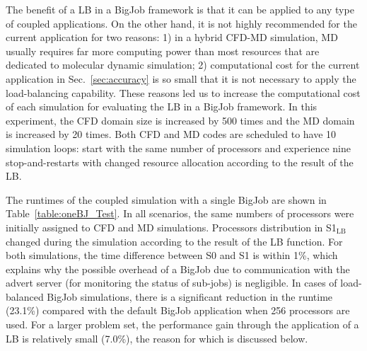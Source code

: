\documentclass[preprint,12pt]{elsarticle}
\newcommand{\subscript}[1]{\ensuremath{_{\textrm{#1}}}}
\newcommand{\lb}[0]{\subscript{LB} }
\begin{document}
The benefit of a LB in a BigJob framework is that it can be applied to any type of coupled applications. On the other hand, it is not highly recommended for the current application for two reasons: 1) in a hybrid CFD-MD simulation, MD usually requires far more computing power than most resources that are dedicated to molecular dynamic simulation; 2) computational cost for the current application in Sec.~\ref{sec:accuracy} is so small that it is not necessary to apply the load-balancing capability. These reasons led us to increase the computational cost of each simulation for evaluating the LB in a BigJob framework. In this experiment, the CFD domain size is increased by 500 times and the MD domain is increased by 20 times. Both CFD and MD codes are scheduled to have 10 simulation loops: start with the same number of processors and experience nine stop-and-restarts with changed resource allocation according to the result of the LB.


The runtimes of the coupled simulation with a single BigJob are shown in Table~\ref{table:oneBJ_Test}. In all scenarios, the same numbers of processors were initially assigned to CFD and MD simulations. Processors distribution in S1\lb changed during the simulation according to the result of the LB function. For both simulations, the time difference between S0 and S1 is within 1\%, which explains why the possible overhead of a BigJob due to communication with the advert server (for monitoring the status of sub-jobs) is negligible. In cases of load-balanced BigJob simulations, there is a significant reduction in the runtime (23.1\%) compared with the default BigJob application when 256 processors are used. For a larger problem set, the performance gain through the application of a LB is relatively small (7.0\%), the reason for which is discussed below.
\end{document}
